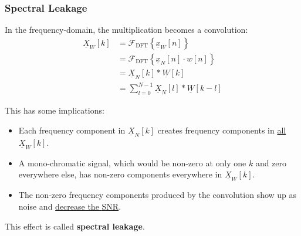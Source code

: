 \begin{refsection}
\subsubsection{Spectral Leakage}

In the frequency-domain, the multiplication becomes a convolution:
\begin{equation}
	\begin{split}
		\underline{X}_W[k] &= \mathcal{F}_{\text{DFT}}\left\{\underline{x}_W[n]\right\} \\
		 &= \mathcal{F}_{\text{DFT}}\left\{\underline{x}_N[n] \cdot w[n]\right\} \\
		 &= \underline{X}_N[k] * \underline{W}[k] \\
		 &= \sum\limits_{l=0}^{N-1} \underline{X}_N[l] * \underline{W}[k-l]
	\end{split}
\end{equation}

This has some implications:
\begin{itemize}
	\item Each frequency component in $\underline{X}_N[k]$ creates frequency components in \underline{all} $\underline{X}_W[k]$.
	\item A mono-chromatic signal, which would be non-zero at only one $k$ and zero everywhere else, has non-zero components everywhere in $\underline{X}_W[k]$.
	\item The non-zero frequency components produced by the convolution show up as noise and \underline{decrease the \ac{SNR}}.
\end{itemize}
This effect is called  \textbf{spectral leakage}.

\begin{figure}[H]
	\centering
	

\end{figure}
\end{refsection}
